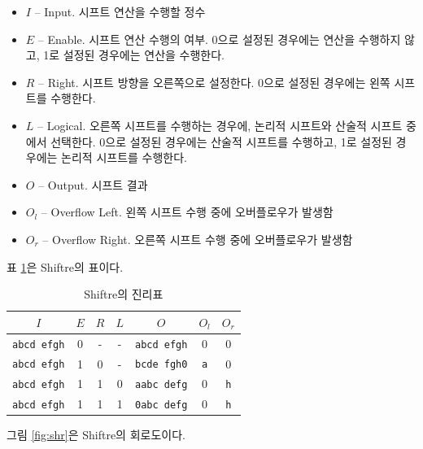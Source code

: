 \documentclass{article}
\renewcommand{\figurename}{그림}
\renewcommand{\tablename}{표}
\begin{document}
\begin{itemize}
    \item $I$ -- Input. 시프트 연산을 수행할 정수
    \item $E$ -- Enable. 시프트 연산 수행의 여부.
        0으로 설정된 경우에는 연산을 수행하지 않고,
        1로 설정된 경우에는 연산을 수행한다.
    \item $R$ -- Right. 시프트 방향을 오른쪽으로 설정한다.
        0으로 설정된 경우에는 왼쪽 시프트를 수행한다.
    \item $L$ -- Logical. 오른쪽 시프트를 수행하는 경우에,
        논리적 시프트와 산술적 시프트 중에서 선택한다.
        0으로 설정된 경우에는 산술적 시프트를 수행하고,
        1로 설정된 경우에는 논리적 시프트를 수행한다.
    \item $O$ -- Output. 시프트 결과
    \item $O_l$ -- Overflow Left. 왼쪽 시프트 수행 중에 오버플로우가 발생함
    \item $O_r$ -- Overflow Right. 오른쪽 시프트 수행 중에 오버플로우가 발생함
\end{itemize}

\tablename{} \ref{tab:shr}은 Shiftre의 표이다.

\begin{table}[h]
    \centering
    \begin{tabular}{c|ccc|ccc}
        $I$ & $E$ & $R$ & $L$ & $O$ & $O_l$ & $O_r$ \\
        \hline
        \texttt{abcd efgh} & 0 & - & - & \texttt{abcd efgh} & 0 & 0 \\
        \texttt{abcd efgh} & 1 & 0 & - & \texttt{bcde fgh0} & \texttt a & 0 \\
        \texttt{abcd efgh} & 1 & 1 & 0 & \texttt{aabc defg} & 0 & \texttt h \\
        \texttt{abcd efgh} & 1 & 1 & 1 & \texttt{0abc defg} & 0 & \texttt h \\
    \end{tabular}
    \caption{Shiftre의 진리표}
    \label{tab:shr}
\end{table}

\figurename{} \ref{fig:shr}은 Shiftre의 회로도이다.
\end{document}
